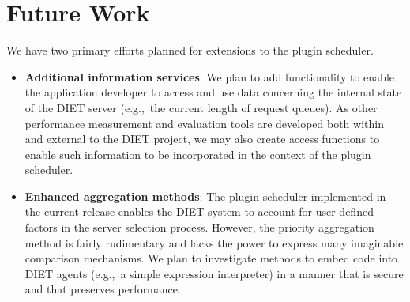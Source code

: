 \section{Future Work}

We have two primary efforts planned for extensions to the plugin
scheduler.
\begin{itemize}
\item \textbf{Additional information services}: We plan to add
  functionality to enable the application developer to access and use
  data concerning the internal state of the DIET server (e.g.,~the
  current length of request queues).  As other performance measurement
  and evaluation tools are developed both within and external to the
  DIET project, we may also create access functions to enable such
  information to be incorporated in the context of the plugin
  scheduler.
\item \textbf{Enhanced aggregation methods}: The plugin scheduler
  implemented in the current release enables the DIET system to
  account for user-defined factors in the server selection process.
  However, the priority aggregation method is fairly rudimentary and
  lacks the power to express many imaginable comparison mechanisms.
  We plan to investigate methods to embed code into DIET agents
  (e.g.,~a simple expression interpreter) in a manner that is secure
  and that preserves performance.
\end{itemize}

